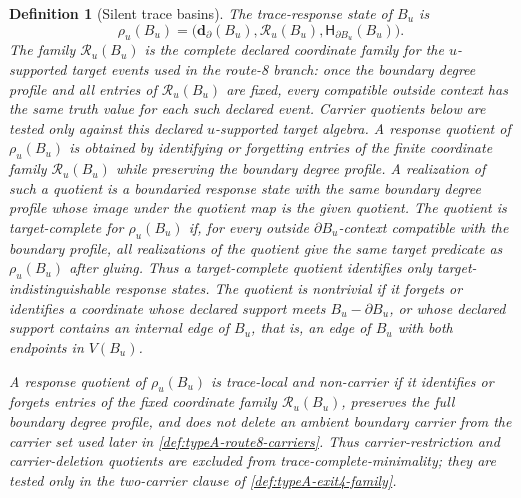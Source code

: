 \documentclass[11pt]{article}
\newtheorem{definition}[theorem]{Definition}
\newcommand{\profile}{\mathsf H}
\begin{document}
\begin{definition}[Silent trace basins]
The \emph{trace-response state} of $B_u$ is
\[
\rho_u(B_u)=
\bigl(\mathbf d_\partial(B_u),\mathcal R_u(B_u),\profile_{\partial B_u}(B_u)\bigr).
\]
The family $\mathcal R_u(B_u)$ is the complete declared coordinate family for
the $u$-supported target events used in the route-8 branch: once the boundary
degree profile and all entries of $\mathcal R_u(B_u)$ are fixed, every
compatible outside context has the same truth value for each such declared
event.  Carrier quotients below are tested only against this declared
$u$-supported target algebra.
A \emph{response quotient} of $\rho_u(B_u)$ is obtained by identifying or
forgetting entries of the finite coordinate family $\mathcal R_u(B_u)$ while
preserving the boundary degree profile.  A realization of such a quotient is a
boundaried response state with the same boundary degree profile whose image
under the quotient map is the given quotient.  The quotient is
\emph{target-complete} for $\rho_u(B_u)$ if, for every outside
$\partial B_u$-context compatible with the boundary profile, all realizations of
the quotient give the same target predicate as $\rho_u(B_u)$ after gluing.
Thus a target-complete quotient identifies only target-indistinguishable
response states.  The quotient is \emph{nontrivial} if it forgets or identifies
a coordinate whose declared support meets \(B_u-\partial B_u\), or whose
declared support contains an internal edge of \(B_u\), that is, an edge of
\(B_u\) with both endpoints in \(V(B_u)\).

A response quotient of \(\rho_u(B_u)\) is \emph{trace-local and non-carrier} if
it identifies or forgets entries of the fixed coordinate family
\(\mathcal R_u(B_u)\), preserves the full boundary degree profile, and does not
delete an ambient boundary carrier from the carrier set used later in
\cref{def:typeA-route8-carriers}.  Thus carrier-restriction and
carrier-deletion quotients are excluded from trace-complete-minimality; they
are tested only in the two-carrier clause of
\cref{def:typeA-exit4-family}.


\end{definition}
\end{document}
